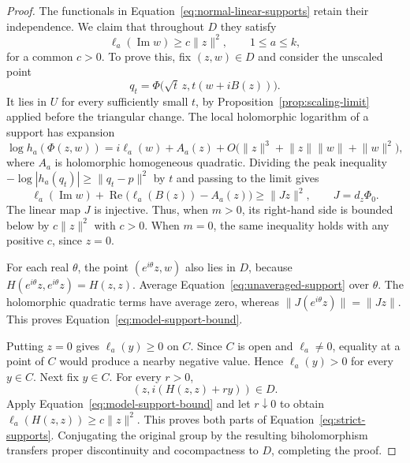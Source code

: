 \begin{proof}
The functionals in Equation~\eqref{eq:normal-linear-supports} retain
their independence.  We claim that throughout $D$ they satisfy
\begin{equation}
\label{eq:model-support-bound}
 \ell_a(\operatorname{Im}w)\ge c\lVert z\rVert^2,
 \qquad 1\le a\le k,
\end{equation}
for a common $c>0$.  To prove this, fix $(z,w)\in D$ and consider the
unscaled point
\[
 q_t=\Phi\bigl(\sqrt t\,z,
                 t(w+iB(z))\bigr).
\]
It lies in $U$ for every sufficiently small $t$, by
Proposition~\ref{prop:scaling-limit} applied before the triangular
change.  The local holomorphic logarithm of a support has expansion
\[
 \log h_a(\Phi(z,w))
   =i\ell_a(w)+A_a(z)
      +O\bigl(\lVert z\rVert^3+
               \lVert z\rVert\lVert w\rVert+
               \lVert w\rVert^2\bigr),
\]
where $A_a$ is holomorphic homogeneous quadratic.  Dividing the peak
inequality $-\log|h_a(q_t)|\ge\lVert q_t-p\rVert^2$ by $t$ and passing
to the limit gives
\begin{equation}
\label{eq:unaveraged-support}
 \ell_a(\operatorname{Im}w)
       +\operatorname{Re}\bigl(\ell_a(B(z))-A_a(z)\bigr)
 \ge \lVert Jz\rVert^2,
 \qquad J=d_z\Phi_0.
\end{equation}
The linear map $J$ is injective.  Thus, when $m>0$, its right-hand side
is bounded below by $c\lVert z\rVert^2$ with $c>0$.  When $m=0$, the
same inequality holds with any positive $c$, since $z=0$.

For each real $\theta$, the point $(e^{i\theta}z,w)$ also lies in $D$,
because $H(e^{i\theta}z,e^{i\theta}z)=H(z,z)$.  Average
Equation~\eqref{eq:unaveraged-support} over $\theta$.  The holomorphic
quadratic terms have average zero, whereas
$\lVert J(e^{i\theta}z)\rVert=\lVert Jz\rVert$.  This proves
Equation~\eqref{eq:model-support-bound}.

Putting $z=0$ gives $\ell_a(y)\ge0$ on $C$.  Since $C$ is open and
$\ell_a\ne0$, equality at a point of $C$ would produce a nearby negative
value.  Hence $\ell_a(y)>0$ for every $y\in C$.  Next fix $y\in C$.
For every $r>0$,
\[
 (z,i(H(z,z)+ry))\in D.
\]
Apply Equation~\eqref{eq:model-support-bound} and let $r\downarrow0$ to
obtain $\ell_a(H(z,z))\ge c\lVert z\rVert^2$.  This proves both parts of
Equation~\eqref{eq:strict-supports}.  Conjugating the original group by
the resulting biholomorphism transfers proper discontinuity and
cocompactness to $D$, completing the proof.
\end{proof}
